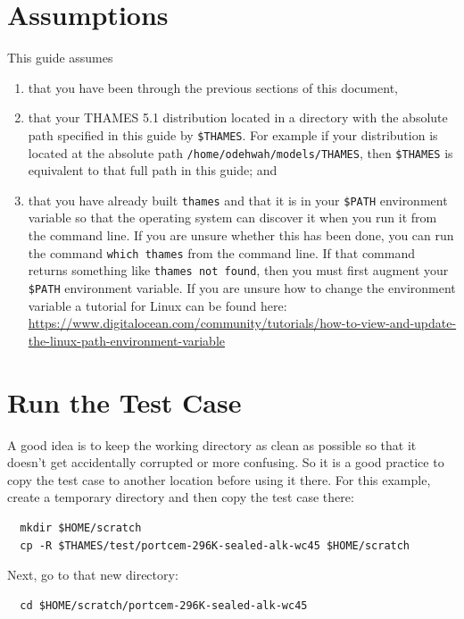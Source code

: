 \documentclass{article}
\begin{document}
{\section{\label{sec:assumption} Assumptions}
This guide assumes
\begin{enumerate}
	\item that you have been through the previous sections of this document,
	\item that your THAMES 5.1 distribution located in a directory
	      with the absolute path specified in this guide by \verb!$THAMES!. For example
	      if your distribution is located at the absolute path
	      \verb!/home/odehwah/models/THAMES!, then \verb!$THAMES! is equivalent to that
	      full path in this guide; and
	\item that you have already built \verb!thames! and that it is in
	      your \verb!$PATH! environment variable so that the operating system can discover it
	      when you run it from the command line. If you are unsure whether this has been
	      done, you can run the command \verb!which thames! from the command line. If that
	      command returns something like \verb!thames not found!, then you must first
	      augment your \verb!$PATH! environment variable. If you are unsure how to
	      change the environment variable a tutorial for Linux can be found
	      here: \url{https://www.digitalocean.com/community/tutorials/how-to-view-and-update-the-linux-path-environment-variable}
\end{enumerate}

\section{\label{sec:runtestcase} Run the Test Case}
A good idea is to keep the working directory as clean as possible so that it
doesn't get accidentally corrupted or more confusing. So it is a good practice
to copy the test case to another location before using it there. For this
example, create a temporary directory and then copy the test case there:
\scriptsize{
	\begin{lstlisting}
  mkdir $HOME/scratch
  cp -R $THAMES/test/portcem-296K-sealed-alk-wc45 $HOME/scratch
\end{lstlisting}
}

\normalsize{ }
Next, go to that new directory:
\scriptsize{
	\begin{lstlisting}
  cd $HOME/scratch/portcem-296K-sealed-alk-wc45
\end{lstlisting}
}

}
\end{document}
